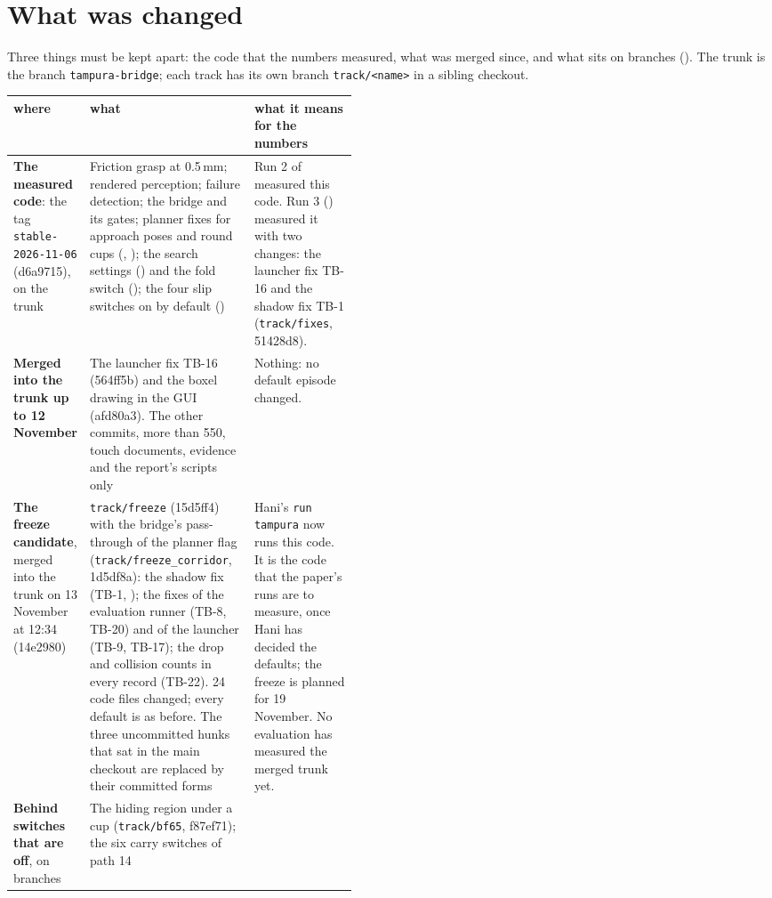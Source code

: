 \section{What was changed}
\label{sec:changed}

Three things must be kept apart: the code that the numbers measured, what was merged since, and what sits on
branches (). The trunk is the branch \texttt{tampura-bridge}; each track has its own branch
\texttt{track/<name>} in a sibling checkout.

\begin{table}[H]
\centering\footnotesize
\begin{tabularx}{\linewidth}{@{}P{0.155\linewidth}Y P{0.30\linewidth}@{}}
\toprule
where & what & what it means for the numbers \\
\midrule
\textbf{The measured code}: the tag \texttt{stable-2026-11-06} (d6a9715), on the trunk &
Friction grasp at 0.5\,mm; rendered perception; failure detection; the bridge and its gates; planner fixes for
approach poses and round cups (, ); the search settings () and the fold switch (); the
four slip switches on by default () &
Run 2 of  measured this code. Run 3 () measured it with two changes: the launcher fix TB-16 and the
shadow fix TB-1 (\texttt{track/fixes}, 51428d8). \\
\textbf{Merged into the trunk up to 12 November} &
The launcher fix TB-16 (564ff5b) and the boxel drawing in the GUI (afd80a3). The other commits, more than 550,
touch documents, evidence and the report's scripts only &
Nothing: no default episode changed. \\
\textbf{The freeze candidate}, merged into the trunk on 13 November at 12:34 (14e2980) &
\texttt{track/freeze} (15d5ff4) with the bridge's pass-through of the planner flag
(\texttt{track/freeze\_corridor}, 1d5df8a): the shadow fix (TB-1, ); the fixes of the evaluation runner
(TB-8, TB-20) and of the launcher (TB-9, TB-17); the drop and collision counts in every record (TB-22). 24 code
files changed; every default is as before. The three uncommitted hunks that sat in the main checkout are
replaced by their committed forms &
Hani's \texttt{run tampura} now runs this code. It is the code that the paper's runs are to measure, once Hani
has decided the defaults; the freeze is planned for 19 November. No evaluation has measured the merged trunk
yet. \\
\textbf{Behind switches that are off}, on branches &
The hiding region under a cup (\texttt{track/bf65}, f87ef71); the six carry switches of path 14

\end{tabularx}
\end{table}
